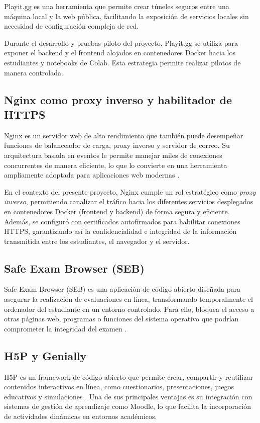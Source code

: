\documentclass[letter,oneside,12pt,spanish]{report}
\begin{document}
Playit.gg es una herramienta que permite crear túneles seguros entre una máquina local y la web pública, facilitando la exposición de servicios locales sin necesidad de configuración compleja de red.

Durante el desarrollo y pruebas piloto del proyecto, Playit.gg se utiliza para exponer el backend y el frontend alojados en contenedores Docker hacia los estudiantes y notebooks de Colab. Esta estrategia permite realizar pilotos de manera controlada.

\subsection{Nginx como proxy inverso y habilitador de HTTPS}

Nginx es un servidor web de alto rendimiento que también puede desempeñar funciones de balanceador de carga, proxy inverso y servidor de correo. Su arquitectura basada en eventos le permite manejar miles de conexiones concurrentes de manera eficiente, lo que lo convierte en una herramienta ampliamente adoptada para aplicaciones web modernas \parencite{nginx2025}.

En el contexto del presente proyecto, Nginx cumple un rol estratégico como \textit{proxy inverso}, permitiendo canalizar el tráfico hacia los diferentes servicios desplegados en contenedores Docker (frontend y backend) de forma segura y eficiente. Además, se configuró con certificados autofirmados para habilitar conexiones HTTPS, garantizando así la confidencialidad e integridad de la información transmitida entre los estudiantes, el navegador y el servidor.

\subsection{Safe Exam Browser (SEB)}

Safe Exam Browser (SEB) es una aplicación de código abierto diseñada para asegurar la realización de evaluaciones en línea, transformando temporalmente el ordenador del estudiante en un entorno controlado. Para ello, bloquea el acceso a otras páginas web, programas o funciones del sistema operativo que podrían comprometer la integridad del examen \parencite{seb2023}.

\subsection{H5P y Genially}

H5P es un framework de código abierto que permite crear, compartir y reutilizar contenidos interactivos en línea, como cuestionarios, presentaciones, juegos educativos y simulaciones \parencite{h5p2023}. Una de sus principales ventajas es su integración con sistemas de gestión de aprendizaje como Moodle, lo que facilita la incorporación de actividades dinámicas en entornos académicos.
\end{document}
